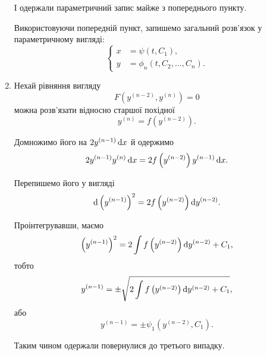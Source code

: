 \begin{enumerate}
    І одержали параметричний запис майже з попереднього пункту. \parvskip
    
    Використовуючи попередній пункт, запишемо загальний розв'язок у параметричному вигляді:
    \begin{equation*}
    	\left\{
    		\begin{aligned}
    			x &= \psi(t, C_1), \\
    			y &= \phi_n(t, C_2, \ldots, C_n).
    		\end{aligned}
    	\right.
    \end{equation*}
     
    \item Нехай рівняння вигляду
    \begin{equation*}
    	F \left( y^{(n-2)}, y^{(n)} \right) = 0
    \end{equation*}
    можна розв'язати відносно старшої похідної
    \begin{equation*}
    	y^{(n)} = f \left( y^{(n-2)} \right).
    \end{equation*}
    
    Домножимо його на $2 y^{(n-1)}  \mathop{}\!\mathrm{d} x$ й одержимо
    \begin{equation*}
    	2 y^{(n-1)}  y^{(n)}  \mathop{}\!\mathrm{d} x= 2 f \left( y^{(n-2)} \right)  y^{(n-1)}  \mathop{}\!\mathrm{d} x.
    \end{equation*}
    
    Перепишемо його у вигляді
    \begin{equation*}
    	\mathop{}\!\mathrm{d} \left( y^{(n-1)} \right)^2 = 2 f \left( y^{(n-2)} \right)  \mathop{}\!\mathrm{d} y^{(n-2)}.
    \end{equation*}
    
    Проінтегрувавши, маємо
    \begin{equation*}
    	\left( y^{(n-1)} \right)^2 = 2 \int f \left( y^{(n-2)} \right)  \mathop{}\!\mathrm{d} y^{(n-2)} + C_1,
    \end{equation*}
    тобто 
    \begin{equation*}
    	y^{(n-1)}  = \pm \sqrt{2 \int f \left( y^{(n-2)} \right)  \mathop{}\!\mathrm{d} y^{(n-2)} + C_1},
    \end{equation*}
    або
    \begin{equation*}
    	y^{(n-1)}  = \pm \psi_1 \left( y^{(n-2)}, C_1 \right).
    \end{equation*}
    
    Таким чином одержали повернулися до третього випадку.
\end{enumerate}